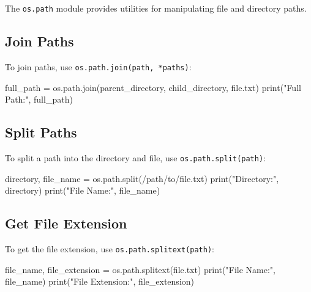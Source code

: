 \documentclass[
  letterpaper,
  DIV=11,
  numbers=noendperiod]{scrreprt}
\newenvironment{Shaded}{\begin{snugshade}}{\end{snugshade}}
\newcommand{\BuiltInTok}[1]{\textcolor[rgb]{0.00,0.23,0.31}{#1}}
\newcommand{\NormalTok}[1]{\textcolor[rgb]{0.00,0.23,0.31}{#1}}
\newcommand{\OperatorTok}[1]{\textcolor[rgb]{0.37,0.37,0.37}{#1}}
\newcommand{\StringTok}[1]{\textcolor[rgb]{0.13,0.47,0.30}{#1}}
\begin{document}
The \texttt{os.path} module provides utilities for manipulating file and
directory paths.

\subsection{Join Paths}\label{join-paths}

To join paths, use \texttt{os.path.join(path,\ *paths)}:

\begin{Shaded}
\begin{Highlighting}[]
\NormalTok{full\_path }\OperatorTok{=}\NormalTok{ os.path.join(}\StringTok{\textquotesingle{}parent\_directory\textquotesingle{}}\NormalTok{, }\StringTok{\textquotesingle{}child\_directory\textquotesingle{}}\NormalTok{, }\StringTok{\textquotesingle{}file.txt\textquotesingle{}}\NormalTok{)}
\BuiltInTok{print}\NormalTok{(}\StringTok{"Full Path:"}\NormalTok{, full\_path)}
\end{Highlighting}
\end{Shaded}

\subsection{Split Paths}\label{split-paths}

To split a path into the directory and file, use
\texttt{os.path.split(path)}:

\begin{Shaded}
\begin{Highlighting}[]
\NormalTok{directory, file\_name }\OperatorTok{=}\NormalTok{ os.path.split(}\StringTok{\textquotesingle{}/path/to/file.txt\textquotesingle{}}\NormalTok{)}
\BuiltInTok{print}\NormalTok{(}\StringTok{"Directory:"}\NormalTok{, directory)}
\BuiltInTok{print}\NormalTok{(}\StringTok{"File Name:"}\NormalTok{, file\_name)}
\end{Highlighting}
\end{Shaded}

\subsection{Get File Extension}\label{get-file-extension}

To get the file extension, use \texttt{os.path.splitext(path)}:

\begin{Shaded}
\begin{Highlighting}[]
\NormalTok{file\_name, file\_extension }\OperatorTok{=}\NormalTok{ os.path.splitext(}\StringTok{\textquotesingle{}file.txt\textquotesingle{}}\NormalTok{)}
\BuiltInTok{print}\NormalTok{(}\StringTok{"File Name:"}\NormalTok{, file\_name)}
\BuiltInTok{print}\NormalTok{(}\StringTok{"File Extension:"}\NormalTok{, file\_extension)}
\end{Highlighting}
\end{Shaded}
\end{document}
